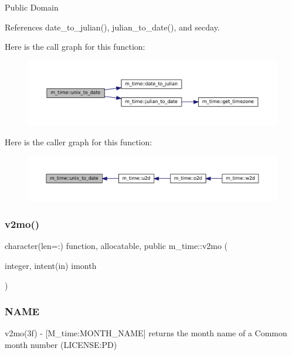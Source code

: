 Public Domain 

References date\+\_\+to\+\_\+julian(), julian\+\_\+to\+\_\+date(), and secday.

Here is the call graph for this function\+:\nopagebreak
\begin{figure}[H]
\begin{center}
\leavevmode
\includegraphics[width=350pt]{namespacem__time_acc62ada23f8fa2fe67b428702fbcbf1c_cgraph}
\end{center}
\end{figure}
Here is the caller graph for this function\+:\nopagebreak
\begin{figure}[H]
\begin{center}
\leavevmode
\includegraphics[width=350pt]{namespacem__time_acc62ada23f8fa2fe67b428702fbcbf1c_icgraph}
\end{center}
\end{figure}
\mbox{\label{namespacem__time_a6f28cf00e4998bb50bb503f5e4bd3f77}} 
\subsubsection{\texorpdfstring{v2mo()}{v2mo()}}
{\footnotesize\ttfamily character(len=\+:) function, allocatable, public m\+\_\+time\+::v2mo (\begin{DoxyParamCaption}\item[{integer, intent(in)}]{imonth }\end{DoxyParamCaption})}



\subsubsection*{N\+A\+ME}

v2mo(3f) -\/ \mbox{[}M\+\_\+time\+:M\+O\+N\+T\+H\+\_\+\+N\+A\+ME\mbox{]} returns the month name of a Common month number (L\+I\+C\+E\+N\+SE\+:PD) 

